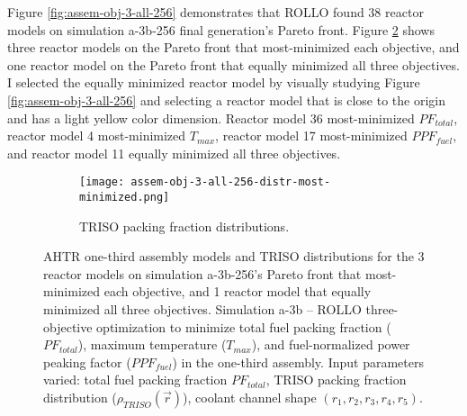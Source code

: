 Figure \ref{fig:assem-obj-3-all-256} demonstrates that \gls{ROLLO} found 38 reactor 
models on simulation a-3b-256 final generation's Pareto front. 
Figure \ref{fig:assem-obj-3-all-256-most-minimized} shows three reactor models on the 
Pareto front that most-minimized each objective, and one reactor model on the 
Pareto front that equally minimized all three objectives. 
I selected the equally minimized reactor model by visually studying Figure 
\ref{fig:assem-obj-3-all-256} and selecting a reactor model that is close to the origin 
and has a light yellow color dimension. 
Reactor model 36 most-minimized $PF_{total}$, reactor model 4 most-minimized $T_{max}$, 
reactor model 17 most-minimized $PPF_{fuel}$, and reactor model 11 equally minimized 
all three objectives. 
\begin{figure}[htbp!]
    \centering
    \begin{subfigure}{\textwidth}
    \centering
    \texttt{[image: assem-obj-3-all-256-distr-most-minimized.png]}
    \caption{TRISO packing fraction distributions.}
    \label{fig:assem-obj-3-all-256-most-minimized-distr}
    \end{subfigure}
    \caption{AHTR one-third assembly models and TRISO distributions for the 3 reactor 
    models on simulation a-3b-256's Pareto front that most-minimized each objective, and 
    1 reactor model that equally minimized all three objectives.
    Simulation a-3b -- ROLLO three-objective optimization to minimize 
    total fuel packing fraction ($PF_{total}$), maximum temperature ($T_{max}$), 
    and fuel-normalized power peaking factor ($PPF_{fuel}$) in the one-third assembly. 
    Input parameters varied: total fuel packing fraction $PF_{total}$, 
    TRISO packing fraction distribution ($\rho_{TRISO}(\vec{r})$), 
    coolant channel shape $(r_1, r_2, r_3, r_4, r_5)$.}
    \label{fig:assem-obj-3-all-256-most-minimized}
\end{figure}

